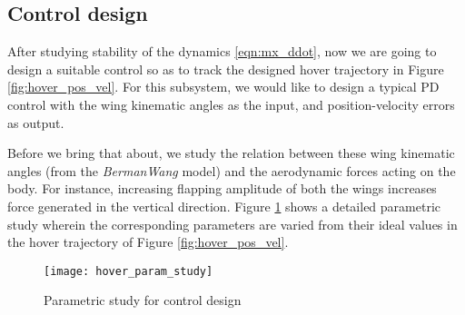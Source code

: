 \documentclass[10pt]{article}
\begin{document}
\subsection{Control design}
After studying stability of the dynamics \eqref{eqn:mx_ddot}, now we are going to design a suitable control so as to track the designed hover trajectory in Figure \ref{fig:hover_pos_vel}. For this subsystem, we would like to design a typical PD control with the wing kinematic angles as the input, and position-velocity errors as output.

Before we bring that about, we study the relation between these wing kinematic angles (from the \textit{BermanWang} model) and the aerodynamic forces acting on the body. For instance, increasing flapping amplitude of both the wings increases force generated in the vertical direction. Figure \ref{fig:hover_param} shows a detailed parametric study wherein the corresponding parameters are varied from their ideal values in the hover trajectory of Figure \ref{fig:hover_pos_vel}.

\begin{figure}[h!]
	\centering
	\texttt{[image: hover\_param\_study]}
	\caption{Parametric study for control design}
	\label{fig:hover_param}
\end{figure}
\end{document}
